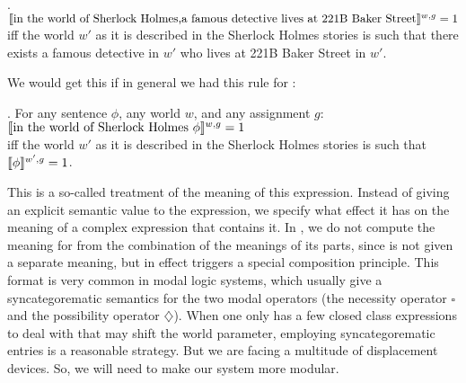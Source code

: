 \ex. $\llbracket \mbox{in the world of Sherlock Holmes,}\\
\mbox{a famous detective lives at 221B Baker Street} \rrbracket^{w,g} = 1$\\
iff the world $w'$ as it is described in the Sherlock Holmes stories is such that there exists a famous detective in $w'$ who lives at 221B Baker Street in $w'$.

We would get this if in general we had this rule for :

\ex. For any sentence $\phi$, any world $w$, and any assignment $g$:\\
$\llbracket \mbox{in the world of Sherlock Holmes }\phi \rrbracket^{w,g} = 1$\\
iff the world $w'$ as it is described in the Sherlock Holmes stories is such that $\llbracket \phi \rrbracket^{w',g} = 1$.

This is a so-called  treatment of the meaning of this expression. Instead of giving an explicit semantic value to the expression, we specify what effect it has on the meaning of a complex expression that contains it. In \Last, we do not compute the meaning for  from the combination of the meanings of its parts, since  is not given a separate meaning, but in effect triggers a special composition principle. This format is very common in modal logic systems, which usually give a syncategorematic semantics for the two modal operators (the necessity operator $\square$ and the possibility operator $\diamondsuit$). When one only has a few closed class expressions to deal with that may shift the world parameter, employing syncategorematic entries is a reasonable strategy. But we are facing a multitude of displacement devices. So, we will need to make our system more modular.

